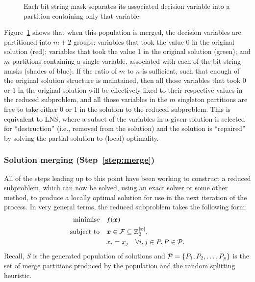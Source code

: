 \documentclass[authoryear,11pt,square,number,times,super,comma]{elsarticle}
\newcommand{\V}[1]{\ensuremath{\boldsymbol{#1}}}
\renewcommand{\S}[1]{\ensuremath{\mathcal{#1}}}
\newcommand{\Min}{\ensuremath{\text{minimise}}}
\newcommand{\ST}{\ensuremath{\text{subject to}}}
\newcommand{\Int}{\mathbb{Z}}
\begin{document}
\begin{figure}[h]
\centering
{}
\caption[Demonstrtation that Merge Search is equivalent to LNS]
       {Each bit string mask separates its associated decision variable into a partition containing only that variable.}
\label{fig:lns-merge}
\end{figure}

Figure~\ref{fig:lns-merge} shows that when this population is merged, the decision variables are partitioned into $m+2$ groups: variables that took the value 0 in the original solution (red); variables that took the value 1 in the original solution (green); and $m$ partitions containing a single variable, associated with each of the bit string masks (shades of blue). If the ratio of $m$ to $n$ is sufficient, such that enough of the original solution structure is maintained, then all those variables that took 0 or 1 in the original solution will be effectively fixed to their respective values in the reduced subproblem, and all those variables in the $m$ singleton partitions are free to take either 0 or 1 in the solution to the reduced subproblem. This is equivalent to LNS, where a subset of the variables in a given solution is selected for ``destruction'' (i.e., removed from the solution) and the solution is ``repaired'' by solving the partial solution to (local) optimality. 

\subsubsection*{Solution merging (Step~\ref{step:merge})}
All of the steps leading up to this point have been working to construct a reduced subproblem, which can now be solved, using an exact solver or some other method, to produce a locally optimal solution for use in the next iteration of the process. In very general terms, the reduced subproblem takes the following form:
\begin{align}
              \Min \quad & f(\V{x})\label{eq:merge_group}\\
              \ST \quad  &\V{x} \in \S{F} \subseteq \Int_2^{|\V{x}|},\nonumber\\
              & x_i = x_j \quad \forall i,j \in P, P \in {\cal P}.\nonumber
\end{align}
Recall, $S$ is the generated population of solutions and ${\cal P} = \{P_1,P_2,\dots,P_p\}$ is the set of merge partitions produced by the population and the random splitting heuristic.
\end{document}
